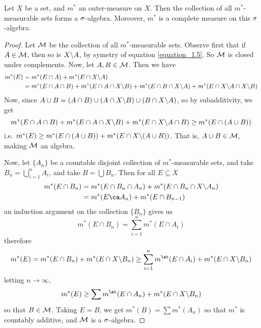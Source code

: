 \begin{theorem}\label{theorem_1.3.3}
    Let $X$ be a set, and $m^\ast$ an outer-measure on $X$. Then the collection
    of all $m^\ast$-measurable sets forms a  $\sigma$-algebra. Moreover,  $m^\ast$
    is a complete measure on this $\sigma$-algebra.
\end{theorem}
\begin{proof}
    Let $\mathcal{M}$ be the collection of all  $m^\ast$-measurable sets. Observe first
    that if  $A \in \mathcal{M}$, then so is $X \backslash A$, by symetry of equation
    \ref{equation_1.5}. So $\mathcal{M}$ is closed under complements. Now, let  $A,B \in
    \mathcal{M}$. Then we have
    \begin{align*}
        m^\ast(E) &= m^\ast(E \cap A)+m^\ast(E \cap X \backslash A) \\
               &= m^\ast(E \cap A \cap B)+m^\ast(E \cap A \cap X \backslash B)
                        +m^\ast(E \cap B \cap X \backslash A)+m^\ast(E \cap
                        X \backslash A \cap X \backslash B) \\
    \end{align*}
    Now, since $A \cup B=(A \cap B) \cup (A \cap X \backslash B) \cup (B \cap
    X \backslash A)$, so by subadditivity, we get
    \begin{equation*}
        m^\ast(E \cap A \cap B)+m^\ast(E \cap A \cap X \backslash B)+m^\ast(E \cap
        X \backslash A \cap B) \geq m^\ast(E \cap (A \cup B))
    \end{equation*}
    i.e. $m^\ast(E) \geq m^\ast(E \cap (A \cup B))+m^\ast(E \cap X \backslash (A \cup
    B))$. That is, $A \cup B \in \mathcal{M}$, making $\mathcal{M}$ an algebra.

    Now, let  $\{A_n\}$ be a countable disjoint collection of
    $m^\ast$-measurable sets, and take  $B_n=\bigcup_{i=1}^n{A_i}$, and take
    $B=\bigcup{B_n}$. Then for all $E \subseteq X$
    \begin{align*}
        m^\ast(E \cap B_n) &= m^\ast(E \cap B_n \cap A_n)+m^\ast(E \cap B_n \cap
                        \com{X}{A_n}) \\
                     &= m^\ast(E \ca A_n)+m^\ast(E \cap B_{n-1})
    \end{align*}
    an induction argument on the collection $\{B_n\}$ gives us
    \begin{equation*}
        m^\ast(E \cap B_n)=\sum_{i=1}^n{m^\ast(E \cap A_i)}
    \end{equation*}
    therefore
    \begin{equation*}
        m^\ast(E)=m^\ast(E \cap B_n)+m^\ast(E \cap \com{X}{B_n}) \geq
        \sum_{i=1}^n{m^\at(E \cap A_i)}+m^\ast(E \cap \com{X}{B_n})
    \end{equation*}
    letting $n \xrightarrow{} \infty$,
    \begin{equation*}
        m^\ast(E) \geq \sum{m^\at(E \cap A_n)}+m^\ast(E \cap \com{X}{B_n})
    \end{equation*}
    so that $B \in \mathcal{M}$. Taking $E=B$, we get  $m^\ast(B)=\sum{m^\ast(A_n)}$ so
    that $m^\ast$ is countably additive, and $\mathcal{M}$ is a $\sigma$-algebra.


\end{proof}
